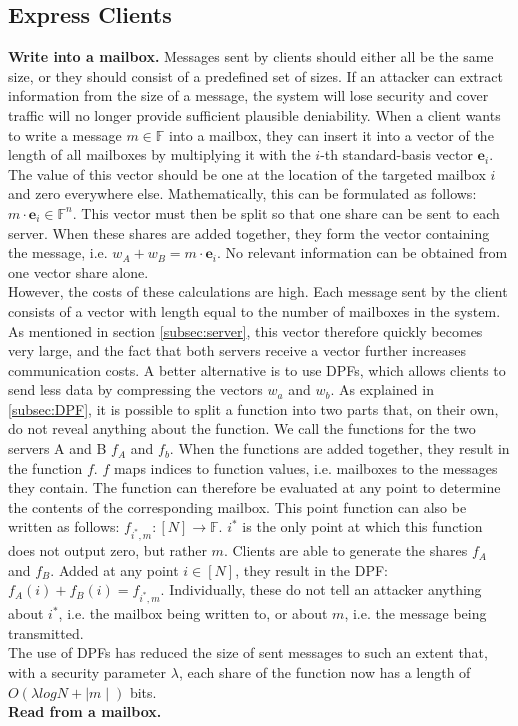 \documentclass[a4paper]{article}
\begin{document}
\subsection{Express Clients} \label{subsec:clients}
\textbf{Write into a mailbox.}
Messages sent by clients should either all be the same size, or they should consist of a predefined set of sizes. If an attacker can extract information from the size of a message, the system will lose security and cover traffic will no longer provide sufficient plausible deniability.
When a client wants to write a message $m \in \mathbb{F}$ into a mailbox, they can insert it into a vector of the length of all mailboxes by multiplying it with the $i$-th standard-basis vector $\mathbf{e}_i$. The value of this vector should be one at the location of the targeted mailbox $i$ and zero everywhere else. Mathematically, this can be formulated as follows: $m \cdot \mathbf{e}_i \in \mathbb{F}^n$. This vector must then be split so that one share can be sent to each server. When these shares are added together, they form the vector containing the message, i.e. $w_A + w_B = m \cdot \mathbf{e}_i$. No relevant information can be obtained from one vector share alone. \\
However, the costs of these calculations are high. Each message sent by the client consists of a vector with length equal to the number of mailboxes in the system. As mentioned in section \ref{subsec:server}, this vector therefore quickly becomes very large, and the fact that both servers receive a vector further increases communication costs.        
A better alternative is to use DPFs, which allows clients to send less data by compressing the vectors $w_a$ and $w_b$. As explained in \ref{subsec:DPF}, it is possible to split a function into two parts that, on their own, do not reveal anything about the function. We call the functions for the two servers A and B $f_A$ and $f_b$. When the functions are added together, they result in the function $f$. $f$ maps indices to function values, i.e. mailboxes to the messages they contain. The function can therefore be evaluated at any point to determine the contents of the corresponding mailbox. This point function can also be written as follows: $f_{i^*,m}: [N] \rightarrow \mathbb{F}$. $i^*$ is the only point at which this function does not output zero, but rather $m$. Clients are able to generate the shares $f_A$ and $f_B$. Added at any point $i \in [N]$, they result in the DPF: $f_A(i) + f_B(i) = f_{i^*,m}$. Individually, these do not tell an attacker anything about $i^*$, i.e. the mailbox being written to, or about $m$, i.e. the message being transmitted. \\
The use of DPFs has reduced the size of sent messages to such an extent that, with a security parameter $\lambda$, each share of the function now has a length of $O(\lambda log N + \mid m \mid)$ bits. \\
\textbf{Read from a mailbox.}
\end{document}
